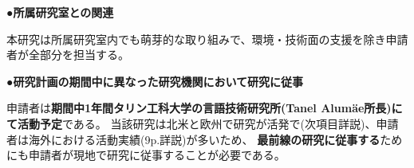 {	\noindent
	●\textbf{所属研究室との関連}

	本研究は所属研究室内でも萌芽的な取り組みで、環境・技術面の支援を除き申請者が全部分を担当する。

	\noindent
	●\textbf{研究計画の期間中に異なった研究機関において研究に従事}
	
	申請者は\textbf{期間中1年間タリン工科大学の言語技術研究所(Tanel Alumäe所長)にて活動予定}である。
	当該研究は北米と欧州で研究が活発で(次項目詳説)、申請者は海外における活動実績(9p.詳説)が多いため、
	\textbf{最前線の研究に従事する}ためにも申請者が現地で研究に従事することが必要である。

}

\newcommand{\人権の保護及び法令等の遵守への対応}{%
	コメント取得を予定してしているSNSはTwitterである。
	Twitter社は2020年3月より学術目的でTwitter APIの利用を自由化しているほか、
	取得したツイートIDを含む情報をデータセットとして公開することも学術目的であれば認められている\cite{twitter_2020}。

	また、先行研究が提供したデータセットを使用する場合は、提供者が示しているライセンスやポリシーを遵守する。

	なお、学習済みモデルの公表は平成30年改正著作権法第30条4号により認められている。

	ただし、本研究では主観評価実験としてSNSユーザを対象としたアンケート調査を予定している。
	この調査により収集したデータは、個⼈の特定につながる情報を匿名化した上で解析を⾏い、
	解析結果の公表に際しては、匿名化を⾏ったデータを⽤い、個⼈情報の漏洩防⽌に配慮する。

	{\footnotesize
		\begin{thebibliography}{99}
			\setcounter{enumiv}{11}
			\bibitem{twitter_2020} Twitter開発者ポリシーを分かりやすくアップデート, 2020年3月11日. (最終閲覧日 2020年4月19日) \url{https://blog.twitter.com/developer/ja_jp/topics/tools/2020/DevPolicyUpdate.html}
		\end{thebibliography}
	}
}

